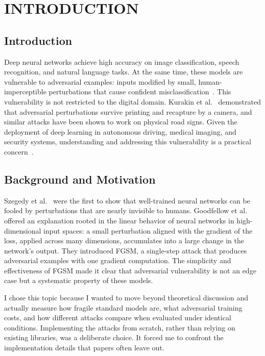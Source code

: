 \chapter{INTRODUCTION}
\label{ch:introduction}

\section{Introduction}

Deep neural networks achieve high accuracy on image classification, speech recognition, and natural language tasks. At the same time, these models are vulnerable to adversarial examples: inputs modified by small, human-imperceptible perturbations that cause confident misclassification~\cite{szegedy2014intriguing,goodfellow2015explaining}. This vulnerability is not restricted to the digital domain. Kurakin et al.~\cite{kurakin2016adversarialphysical} demonstrated that adversarial perturbations survive printing and recapture by a camera, and similar attacks have been shown to work on physical road signs. Given the deployment of deep learning in autonomous driving, medical imaging, and security systems, understanding and addressing this vulnerability is a practical concern~\cite{yuan2019adversarial,ren2020adversarial,chakraborty2018survey,zhou2022adversarial,macas2024adversarial}.

\section{Background and Motivation}

Szegedy et al.~\cite{szegedy2014intriguing} were the first to show that well-trained neural networks can be fooled by perturbations that are nearly invisible to humans. Goodfellow et al.~\cite{goodfellow2015explaining} offered an explanation rooted in the linear behavior of neural networks in high-dimensional input spaces: a small perturbation aligned with the gradient of the loss, applied across many dimensions, accumulates into a large change in the network's output. They introduced FGSM, a single-step attack that produces adversarial examples with one gradient computation. The simplicity and effectiveness of FGSM made it clear that adversarial vulnerability is not an edge case but a systematic property of these models.

I chose this topic because I wanted to move beyond theoretical discussion and actually measure how fragile standard models are, what adversarial training costs, and how different attacks compare when evaluated under identical conditions. Implementing the attacks from scratch, rather than relying on existing libraries, was a deliberate choice. It forced me to confront the implementation details that papers often leave out.

